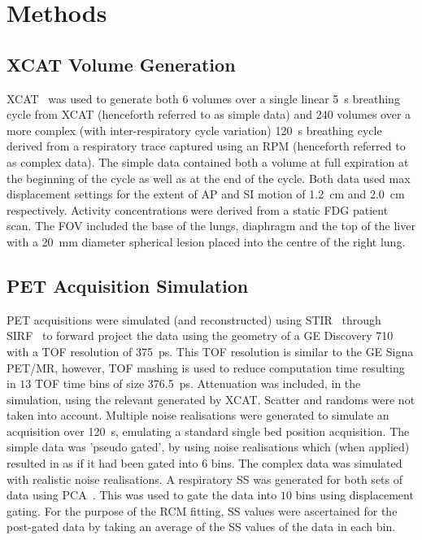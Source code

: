 \section{Methods} \label{sec:methods}
    \subsection{XCAT Volume Generation} \label{sec:xcat_volume_generation}
        \gls{XCAT}~\cite{Segars2010} was used to generate both $6$ volumes over a single linear \SI{5}{\second} breathing cycle from \gls{XCAT} (henceforth referred to as simple data) and $240$ volumes over a more complex (with inter-respiratory cycle variation) \SI{120}{\second} breathing cycle derived from a respiratory trace captured using an \gls{RPM} (henceforth referred to as complex data). The simple data contained both a volume at full expiration at the beginning of the cycle as well as at the end of the cycle. Both data used max displacement settings for the extent of \gls{AP} and \gls{SI} motion of \SI{1.2}{\centi\metre} and \SI{2.0}{\centi\metre} respectively. Activity concentrations were derived from a static \gls{FDG} patient scan. The \gls{FOV} included the base of the lungs, diaphragm and the top of the liver with a \SI{20}{\milli\metre} diameter spherical lesion placed into the centre of the right lung.
    
    \subsection{PET Acquisition Simulation} \label{sec:pet_acquisition_simulation}
        \gls{PET} acquisitions were simulated (and reconstructed) using \gls{STIR}~\cite{Thielemans2012, Efthimiou2018} through \gls{SIRF}~\cite{ Ovtchinnikov2019CCPPETMRSIRF} to forward project the data using the geometry of a \gls{GE} Discovery 710 with a \gls{TOF} resolution of \SI{375}{\pico\second}. This \gls{TOF} resolution is similar to the \gls{GE} Signa \gls{PET}/\gls{MR}, however, \gls{TOF} mashing is used to reduce computation time resulting in $13$ \gls{TOF} time bins of size \SI{376.5}{\pico\second}. Attenuation was included, in the simulation, using the relevant  generated by \gls{XCAT}. Scatter and randoms were not taken into account. Multiple noise realisations were generated to simulate an acquisition over \SI{120}{\second}, emulating a standard single bed position acquisition. The simple data was 'pseudo gated', by using noise realisations which (when applied) resulted in as if it had been gated into $6$ bins. The complex data was simulated with realistic noise realisations. A respiratory \gls{SS} was generated for both sets of data using \gls{PCA}~\cite{Thielemans2011}. This was used to gate the data into $10$ bins using displacement gating. For the purpose of the \gls{RCM} fitting, \gls{SS} values were ascertained for the post-gated data by taking an average of the \gls{SS} values of the data in each bin.
    
